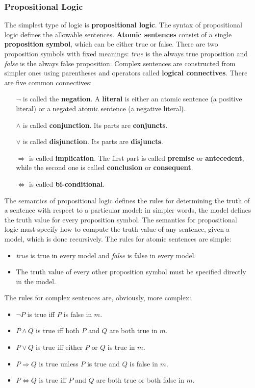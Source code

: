 \documentclass{article}
\begin{document}
\subsubsection{Propositional Logic}
The simplest type of logic is \textbf{propositional logic}. The syntax of propositional logic defines the allowable sentences. \textbf{Atomic sentences} consist of a single \textbf{proposition symbol}, which can be either true or false. There are two proposition symbols with fixed meanings: \textit{true} is the always true proposition and \textit{false} is the always false proposition. Complex sentences are constructed from simpler ones using parentheses and operators called \textbf{logical connectives}. There are five common connectives:
\begin{itemize}
    \item [$\neg$] is called the \textbf{negation}. A \textbf{literal} is either an atomic sentence (a positive literal) or a negated atomic sentence (a negative literal).
    \item [$\land$] is called \textbf{conjunction}. Its parts are \textbf{conjuncts}.
    \item [$\lor$] is called \textbf{disjunction}. Its parts are \textbf{disjuncts}.
    \item [$\Rightarrow$] is called \textbf{implication}. The first part is called \textbf{premise} or \textbf{antecedent}, while the second one is called \textbf{conclusion} or \textbf{consequent}.
    \item [$\Leftrightarrow$] is called \textbf{bi-conditional}.
\end{itemize}

The semantics of propositional logic defines the rules for determining the truth of a sentence with respect to a particular model: in simpler words, the model defines the truth value for every proposition symbol. The semantics for propositional logic must specify how to compute the truth value of any sentence, given a model, which is done recursively. The rules for atomic sentences are simple:
\begin{itemize}
    \item \textit{true} is true in every model and \textit{false} is false in every model.
    \item The truth value of every other proposition symbol must be specified directly in the model.
\end{itemize}

\noindent
The rules for complex sentences are, obviously, more complex:
\begin{itemize}
    \item $\neg P$ is true iff $P$ is false in $m$.
    \item $P \land Q$ is true iff both $P$ and $Q$ are both true in $m$.
    \item $P\lor Q$ is true iff either $P$ or $Q$ is true in $m$.
    \item $P\Rightarrow Q$ is true unless $P$ is true and $Q$ is false in $m$.
    \item $P \Leftrightarrow Q$ is true iff $P$ and $Q$ are both true or both false in $m$.
\end{itemize}
\end{document}
